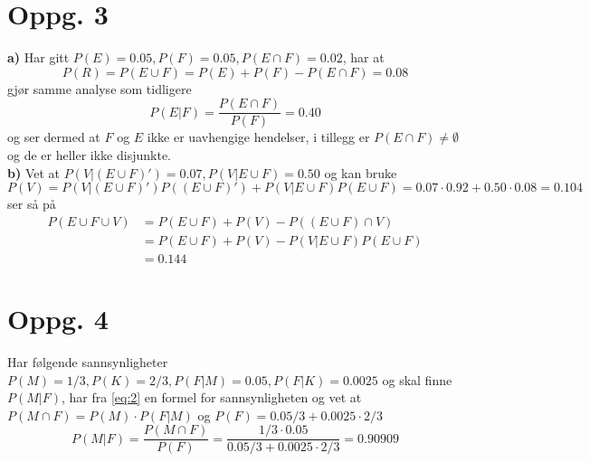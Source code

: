 \documentclass{report}
\begin{document}
\section*{Oppg. 3}
\textbf{a)}
Har gitt $P(E) = 0.05, P(F) = 0.05, P(E\cap F) = 0.02$, har at
\begin{equation}
  \label{eq:8}
  P(R) = P(E\cup F) = P(E) + P(F) - P(E\cap F) = 0.08
\end{equation}
gjør samme analyse som tidligere
\begin{equation}
  \label{eq:9}
  P(E|F) = \frac{P(E\cap F)}{P(F)} = 0.40
\end{equation}
og ser dermed at $F$ og $E$ ikke er uavhengige hendelser, i tillegg er $P(E\cap F) \neq \emptyset$ og de er heller ikke disjunkte. \\

\textbf{b)}
Vet at $P(V | (E\cup F)') = 0.07, P(V | E\cup F) = 0.50$ og kan bruke
\begin{equation}
  \label{eq:18}
  P(V) = P(V|(E\cup F)')P((E\cup F)') + P(V| E\cup F)P(E\cup F) = 0.07\cdot 0.92 + 0.50\cdot 0.08 = 0.104
\end{equation}
ser så på
\begin{equation}
  \label{eq:19}
  \begin{split}
    P(E \cup F \cup V) &= P(E \cup F) + P(V) - P((E\cup F)\cap V) \\
                       &= P(E \cup F) + P(V) - P(V | E\cup F)P(E\cup F) \\
    &= 0.144
  \end{split}
\end{equation}


\section*{Oppg. 4}
Har følgende sannsynligheter $P(M) = 1/3, P(K) = 2/3, P(F|M) = 0.05, P(F|K) = 0.0025$ og skal finne $P(M|F)$, har fra \eqref{eq:2} en formel for sannsynligheten og vet at $P(M\cap F) = P(M)\cdot P(F|M)$ og $P(F) = 0.05/3 + 0.0025\cdot 2/3$
\begin{equation}
  \label{eq:10}
  P(M|F) = \frac{P(M\cap F)}{P(F)} = \frac{1/3 \cdot 0.05}{0.05/3 + 0.0025\cdot 2/3} = 0.90909
\end{equation}
\end{document}

